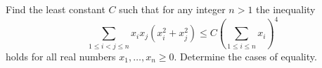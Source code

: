 Find the least constant $C$ such that for any integer $n > 1$ the inequality
\[\sum_{1 \le i < j \le n} x_i x_j (x_i^2 + x_j^2)
  \le C \left( \sum_{1 \le i \le n} x_i \right)^4\]
holds for all real numbers $x_1, \dots, x_n \ge 0$.
Determine the cases of equality.